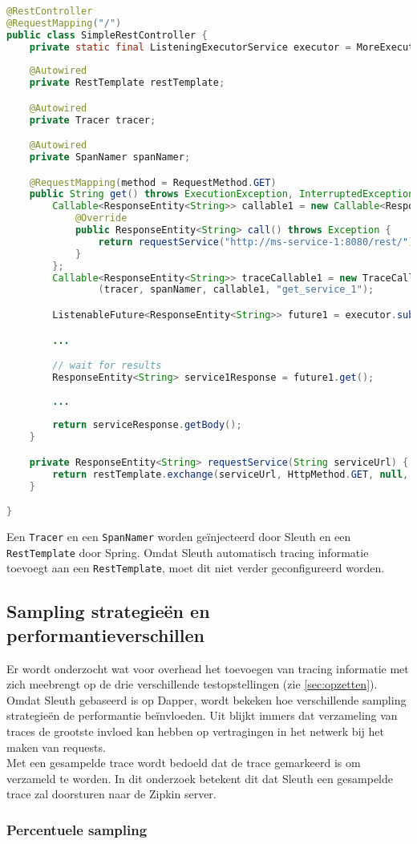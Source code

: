 \begin{lstlisting}[language=Java, caption=Asynchrone REST communicatie]
@RestController
@RequestMapping("/")
public class SimpleRestController {
    private static final ListeningExecutorService executor = MoreExecutors.listeningDecorator(Executors.newCachedThreadPool());
    
    @Autowired
    private RestTemplate restTemplate;

    @Autowired
    private Tracer tracer;

    @Autowired
    private SpanNamer spanNamer;

    @RequestMapping(method = RequestMethod.GET)
    public String get() throws ExecutionException, InterruptedException {
        Callable<ResponseEntity<String>> callable1 = new Callable<ResponseEntity<String>>() {
            @Override
            public ResponseEntity<String> call() throws Exception {
                return requestService("http://ms-service-1:8080/rest/");
            }
        };
        Callable<ResponseEntity<String>> traceCallable1 = new TraceCallable<>
                (tracer, spanNamer, callable1, "get_service_1");

        ListenableFuture<ResponseEntity<String>> future1 = executor.submit(traceCallable1);

        ...

        // wait for results
        ResponseEntity<String> service1Response = future1.get();
        
        ...
        
        return serviceResponse.getBody();
    }

    private ResponseEntity<String> requestService(String serviceUrl) {
        return restTemplate.exchange(serviceUrl, HttpMethod.GET, null, String.class);
    }

}
\end{lstlisting}

Een \texttt{Tracer} en een \texttt{SpanNamer} worden geïnjecteerd door Sleuth en een \texttt{RestTemplate} door Spring. Omdat Sleuth automatisch tracing informatie toevoegt aan een \texttt{RestTemplate}, moet dit niet verder geconfigureerd worden.

\subsection{Sampling strategieën en performantieverschillen}
\label{sec:sampling}

Er wordt onderzocht wat voor overhead het toevoegen van tracing informatie met zich meebrengt op de drie verschillende testopstellingen (zie \ref{sec:opzetten}). Omdat Sleuth gebaseerd is op Dapper, wordt bekeken hoe verschillende sampling strategieën de performantie beïnvloeden. Uit \autocite{Sigelman2010} blijkt immers dat verzameling van traces de grootste invloed kan hebben op vertragingen in het netwerk bij het maken van requests. \\

Met een gesampelde trace wordt bedoeld dat de trace gemarkeerd is om verzameld te worden. In dit onderzoek betekent dit dat Sleuth een gesampelde trace zal doorsturen naar de Zipkin server. \\

\subsubsection{Percentuele sampling}
\label{sec:percentuele-sampling}


